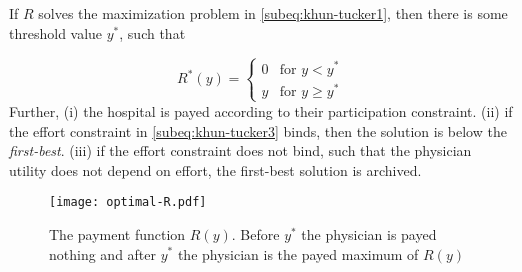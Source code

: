 \begin{proposition}
\label{prop:payment-function}
If $R$ solves the maximization problem in \cref{subeq:khun-tucker1}, then there is some threshold value $y^*$, such that 

\[
    R^*(y)=\begin{cases}
                0 & \text{for } y< y^* \\
                y & \text{for } y\geq y^*
            \end{cases}            
\]
Further,  (i) the hospital is payed according to their participation constraint. (ii)  if the effort constraint in \cref{subeq:khun-tucker3} binds, then the solution is below the \emph{first-best}. (iii)  if the effort constraint does not bind, such that the physician utility does not depend on effort, the first-best solution is archived. 
\end{proposition}


\begin{figure}[htbp]
    \centering
    \texttt{[image: optimal-R.pdf]}
    \caption{The payment function $R(y)$. Before $y^*$ the physician is payed nothing and after $y^*$ the physician is the payed maximum of $R(y)$ }
    \label{fig:label}
\end{figure}

